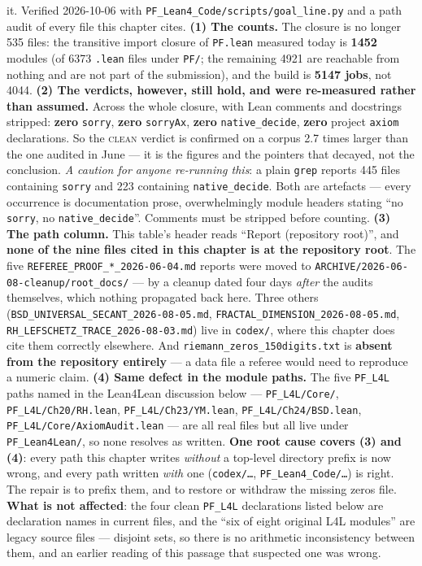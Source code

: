 \begin{footnotesize}
it. Verified 2026-10-06 with \texttt{PF\_Lean4\_Code/scripts/goal\_line.py} and a path audit of every file this chapter cites. \textbf{(1) The counts.} The closure is no longer 535 files: the transitive import closure of \texttt{PF.lean} measured today is \textbf{1452} modules (of 6373 \texttt{.lean} files under \texttt{PF/}; the remaining 4921 are reachable from nothing and are not part of the submission), and the build is \textbf{5147 jobs}, not 4044. \textbf{(2) The verdicts, however, still hold, and were re-measured rather than assumed.} Across the whole closure, with Lean comments and docstrings stripped: \textbf{zero} \texttt{sorry}, \textbf{zero} \texttt{sorryAx}, \textbf{zero} \texttt{native\_decide}, \textbf{zero} project \texttt{axiom} declarations. So the \textsc{clean} verdict is confirmed on a corpus 2.7 times larger than the one audited in June --- it is the figures and the pointers that decayed, not the conclusion. \emph{A caution for anyone re-running this}: a plain \texttt{grep} reports 445 files containing \texttt{sorry} and 223 containing \texttt{native\_decide}. Both are artefacts --- every occurrence is documentation prose, overwhelmingly module headers stating ``no \texttt{sorry}, no \texttt{native\_decide}''. Comments must be stripped before counting. \textbf{(3) The path column.} This table's header reads ``Report (repository root)'', and \textbf{none of the nine files cited in this chapter is at the repository root}. The five \texttt{REFEREE\_PROOF\_*\_2026-06-04.md} reports were moved to \texttt{ARCHIVE/2026-06-08-cleanup/root\_docs/} --- by a cleanup dated four days \emph{after} the audits themselves, which nothing propagated back here. Three others (\texttt{BSD\_UNIVERSAL\_SECANT\_2026-08-05.md}, \texttt{FRACTAL\_DIMENSION\_2026-08-05.md}, \texttt{RH\_LEFSCHETZ\_TRACE\_2026-08-03.md}) live in \texttt{codex/}, where this chapter does cite them correctly elsewhere. And \texttt{riemann\_zeros\_150digits.txt} is \textbf{absent from the repository entirely} --- a data file a referee would need to reproduce a numeric claim. \textbf{(4) Same defect in the module paths.} The five \texttt{PF\_L4L} paths named in the Lean4Lean discussion below --- \texttt{PF\_L4L/Core/}, \texttt{PF\_L4L/Ch20/RH.lean}, \texttt{PF\_L4L/Ch23/YM.lean}, \texttt{PF\_L4L/Ch24/BSD.lean}, \texttt{PF\_L4L/Core/AxiomAudit.lean} --- are all real files but all live under \texttt{PF\_Lean4Lean/}, so none resolves as written. \textbf{One root cause covers (3) and (4)}: every path this chapter writes \emph{without} a top-level directory prefix is now wrong, and every path written \emph{with} one (\texttt{codex/\ldots}, \texttt{PF\_Lean4\_Code/\ldots}) is right. The repair is to prefix them, and to restore or withdraw the missing zeros file. \textbf{What is not affected}: the four clean \texttt{PF\_L4L} declarations listed below are declaration names in current files, and the ``six of eight original L4L modules'' are legacy source files --- disjoint sets, so there is no arithmetic inconsistency between them, and an earlier reading of this passage that suspected one was wrong.


\end{footnotesize}
